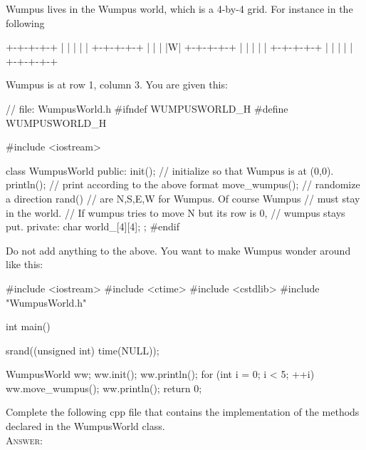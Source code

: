 \nextq
Wumpus lives in the Wumpus world, which is a 4-by-4 grid.
For instance in the following
\begin{console}[frame=single,fontsize=\footnotesize]
+-+-+-+-+
| | | | |
+-+-+-+-+
| | | |W|
+-+-+-+-+
| | | | |
+-+-+-+-+
| | | | |
+-+-+-+-+
\end{console}
Wumpus is at row 1, column 3.
You are given this:
\begin{console}[frame=single,fontsize=\footnotesize]
// file: WumpusWorld.h
#ifndef WUMPUSWORLD_H
#define WUMPUSWORLD_H

#include <iostream>

class WumpusWorld
{
public:
    init();              // initialize so that Wumpus is at (0,0).
    println();           // print according to the above format
    move_wumpus();       // randomize a direction rand() %
                         // are N,S,E,W for Wumpus. Of course Wumpus
                         // must stay in the world.
                         // If wumpus tries to move N but its row is 0,
                         // wumpus stays put.
private:
    char world_[4][4];
};
#endif
\end{console}
Do not add anything to the above.
You want to make Wumpus wonder around like this:
\begin{console}[frame=single,fontsize=\footnotesize]
#include <iostream>
#include <ctime>
#include <cstdlib>
#include "WumpusWorld.h"

int main()
{
    srand((unsigned int) time(NULL));
    
    WumpusWorld ww;
    ww.init();
    ww.println();
    for (int i = 0; i < 5; ++i)
    {
        ww.move_wumpus();
        ww.println();
    }
    return 0;
}
\end{console}
Complete the following cpp file that contains the implementation
of the methods declared in the WumpusWorld class.
\\
\textsc{Answer:}\vspace{-2mm}
